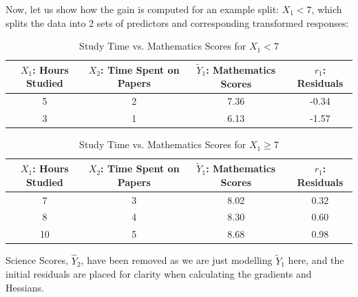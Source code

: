 \documentclass[11pt]{report} %
\begin{document}
Now, let us show how the gain is computed for an example split: $X_1 < 7$, which splits the data into 2 sets of predictors and corresponding transformed responses:
\setlength{\tabcolsep}{4pt} %
\begin{table}[H]
    \centering
    \begin{tabular}{|c|c|c|c|}
        \hline
        \( X_1 \): Hours Studied & \( X_2 \): Time Spent on Papers & \( \tilde{Y}_1 \): Mathematics Scores & \( r_1 \): Residuals \\
        \hline
        5  & 2  & 7.36  & -0.34 \\
        3  & 1  & 6.13  & -1.57 \\
        \hline
    \end{tabular}
    \caption{Study Time vs. Mathematics Scores for $X_1 < 7$}
    \label{tab:adjusted_study_scores6a}
\end{table}
\vspace{-0.2cm}
\setlength{\tabcolsep}{4pt} %
\begin{table}[H]
    \centering
    \begin{tabular}{|c|c|c|c|}
        \hline
        \( X_1 \): Hours Studied & \( X_2 \): Time Spent on Papers & \( \tilde{Y}_1 \): Mathematics Scores & \( r_1 \): Residuals \\
        \hline
        7  & 3  & 8.02  & 0.32 \\
        8  & 4  & 8.30   & 0.60 \\
        10 & 5  & 8.68  & 0.98 \\
        \hline
    \end{tabular}
    \caption{Study Time vs. Mathematics Scores for $X_1 \geq 7$}
    \label{tab:adjusted_study_scores6b}
\end{table}
\noindent Science Scores, $\hat{Y}_2$, have been removed as we are just modelling $\tilde{Y}_1$ here, and the initial residuals are placed for clarity when calculating the gradients and Hessians. 
\end{document}
